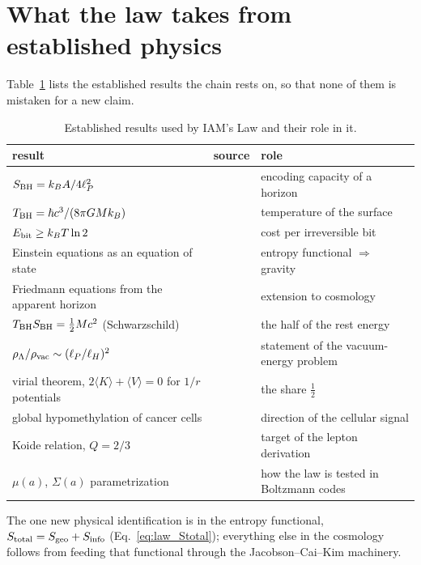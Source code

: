 \section{What the law takes from established physics}\label{sec:law_established}
Table~\ref{tab:law_established} lists the established results the chain rests on, so that none of them is mistaken for a new claim. \observed
\begin{table}[htbp]\centering\small
\caption{Established results used by IAM's Law and their role in it.}\label{tab:law_established}
\begin{tabularx}{\textwidth}{@{}>{\raggedright\arraybackslash}p{}>{\raggedright\arraybackslash}p{}>{\raggedright\arraybackslash}X@{}}\toprule
result & source & role\\\midrule
$S_{\rm BH}=k_BA/4\ell_P^2$ & \cite{Bekenstein1973,Hawking1975} & encoding capacity of a horizon\\
$T_{\rm BH}=\hbar c^3/(8\pi GMk_B)$ & \cite{Hawking1975} & temperature of the surface\\
$E_{\rm bit}\ge k_BT\ln2$ & \cite{Landauer1961,Berut2012,Jun2014} & cost per irreversible bit\\
Einstein equations as an equation of state & \cite{Jacobson1995} & entropy functional $\Rightarrow$ gravity\\
Friedmann equations from the apparent horizon & \cite{CaiKim2005} & extension to cosmology\\
$T_{\rm BH}S_{\rm BH}=\tfrac12Mc^2$ (Schwarzschild) & \cite{Smarr1973,BardeenCarterHawking1973} & the half of the rest energy\\
$\rho_\Lambda/\rho_{\rm vac}\sim(\ell_P/\ell_H)^2$ & \cite{Weinberg1989} & statement of the vacuum-energy problem\\
virial theorem, $2\langle K\rangle+\langle V\rangle=0$ for $1/r$ potentials & \cite{Clausius1870} & the share $\tfrac12$\\
global hypomethylation of cancer cells & \cite{FeinbergVogelstein1983} & direction of the cellular signal\\
Koide relation, $Q=2/3$ & \cite{Koide1982,Koide1983,Koide1983b} & target of the lepton derivation\\
$\mu(a)$, $\Sigma(a)$ parametrization & \cite{PogosianSilvestri2008} & how the law is tested in Boltzmann codes\\\bottomrule
\end{tabularx}
\end{table}
The one new physical identification is in the entropy functional, $S_{\rm total}=S_{\rm geo}+S_{\rm info}$ (Eq.~\eqref{eq:law_Stotal}); everything
else in the cosmology follows from feeding that functional through the Jacobson--Cai--Kim machinery. \conjecture

